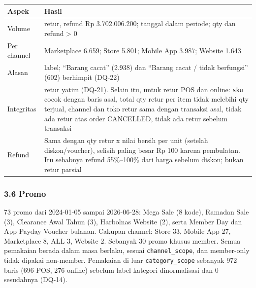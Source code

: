 \documentclass[10pt,a4paper]{article}
\begin{document}
{\def\LTcaptype{none} %
\begin{longtable}[]{@{}
  >{\raggedright\arraybackslash}p{}
  >{\raggedright\arraybackslash}p{}@{}}
\toprule\noalign{}
\begin{minipage}[b]{\linewidth}\raggedright
Aspek
\end{minipage} & \begin{minipage}[b]{\linewidth}\raggedright
Hasil
\end{minipage} \\
\midrule\noalign{}
\endhead
\bottomrule\noalign{}
\endlastfoot
Volume & 18.090 retur, refund Rp 3.702.006.200; tanggal dalam periode; qty dan refund \textgreater{} 0 \\
Per channel & Marketplace 6.659; Store 5.801; Mobile App 3.987; Website 1.643 \\
Alasan & 8 label; ``Barang cacat'' (2.938) dan ``Barang cacat / tidak berfungsi'' (602) berhimpit (DQ-22) \\
Integritas & 1 retur yatim (DQ-21). Selain itu, untuk retur POS dan online: \texttt{sku} cocok dengan baris asal, total qty retur per item tidak melebihi qty terjual, channel dan toko retur sama dengan transaksi asal, tidak ada retur atas order CANCELLED, tidak ada retur sebelum transaksi \\
Refund & Sama dengan qty retur x nilai bersih per unit (setelah diskon/voucher), selisih paling besar Rp 100 karena pembulatan. Itu sebabnya refund 55\%--100\% dari harga sebelum diskon; bukan retur parsial \\
\end{longtable}
}

\subsubsection{3.6 Promo}\label{promo}

73 promo dari 2024-01-05 sampai 2026-06-28: Mega Sale (8 kode), Ramadan Sale (3), Clearance Awal Tahun (3),
Harbolnas Website (2), serta Member Day dan App Payday Voucher bulanan. Cakupan channel: Store 33,
Mobile App 27, Marketplace 8, ALL 3, Website 2. Sebanyak 30 promo khusus member. Semua pemakaian berada
dalam masa berlaku, sesuai \texttt{channel\_\allowbreak{}scope}, dan member-only tidak dipakai non-member. Pemakaian di luar
\texttt{category\_\allowbreak{}scope} sebanyak 972 baris (696 POS, 276 online) sebelum label kategori dinormalisasi dan 0 sesudahnya
(DQ-14).
\end{document}
